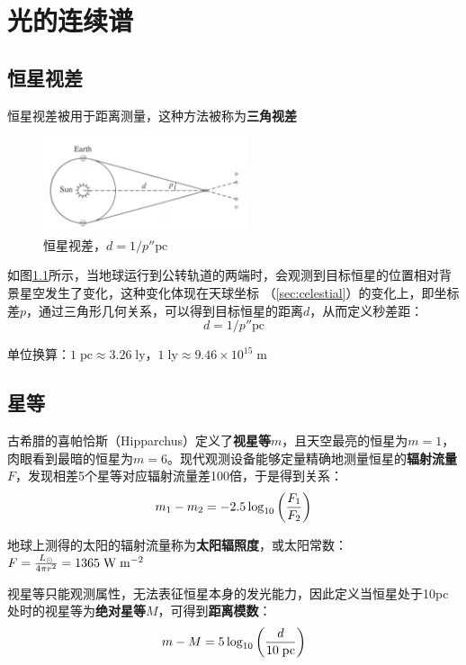 \chapter{光的连续谱}
\section{恒星视差}
恒星视差被用于距离测量，这种方法被称为{\bf 三角视差}

\begin{figure}[hbt]
  \centering
  \includegraphics[width=6cm]{chapters/03/parallax}
  \caption{恒星视差，$d=1/p''\mathrm{pc}$}
  \label{fig:parallax}
\end{figure}

如图\ref{fig:parallax}所示，当地球运行到公转轨道的两端时，会观测到目标恒星的位置相对背景星空发生了变化，这种变化体现在天球坐标
（\autoref{sec:celestial}）的变化上，即坐标差$p$，通过三角形几何关系，可以得到目标恒星的距离$d$，从而定义秒差距：
\begin{equation}
  d=1/p''\mathrm{pc}
\end{equation}

单位换算：$1\;\mathrm{pc}\approx
3.26\;\mathrm{ly}$，$1\;\mathrm{ly}\approx9.46\times10^{15}\;\mathrm m$

\section{星等}
古希腊的喜帕恰斯（Hipparchus）定义了{\bf 视星等}$m$，且天空最亮的恒星为$m=1$，肉眼看到最暗的恒星为$m=6$。现代观测设备能够定量精确地测量恒星的{\bf 辐射流量}$F$，发现相差5个星等对应辐射流量差100倍，于是得到关系：
\begin{equation}
  m_1-m_2=-2.5\log_{10}\left({F_1\over F_2}\right)
  \label{eq:magnitude}
\end{equation}

地球上测得的太阳的辐射流量称为{\bf 太阳辐照度}，或太阳常数：$F={L_\odot \over 4\pi r^2}=1365\;\mathrm{W\;m^{-2}}$

视星等只能观测属性，无法表征恒星本身的发光能力，因此定义当恒星处于10pc处时的视星等为{\bf 绝对星等}$M$，可得到{\bf 距离模数}：
\begin{equation}
  m-M=5\log_{10}\left({d\over 10\;\mathrm{pc}}\right)
  \label{eq:module}
\end{equation}

